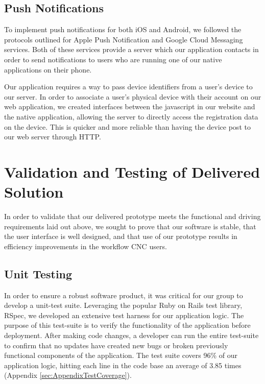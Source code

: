 \documentclass[12pt,letterpaper,titlepage]{article}
\begin{document}
\subsection{Push Notifications} \label{sec:PushNotifications}

To implement push notifications for both iOS and Android, we followed the protocols outlined for Apple Push Notification \cite{apn} and Google Cloud Messaging \cite{gcm} services. Both of these services provide a server which our application contacts in order to send notifications to users who are running one of our native applications on their phone.

Our application requires a way to pass device identifiers from a user's device to our server. In order to associate a user's physical device with their account on our web application, we created interfaces between the javascript in our website and the native application, allowing the server to directly access the registration data on the device. This is quicker and more reliable than having the device post to our web server through HTTP.

\section{Validation and Testing of Delivered Solution} \label{sec:ValidationandTestingofDeliveredSolution}

In order to validate that our delivered prototype meets the functional and driving requirements laid out above, we sought to prove that our software is stable, that the user interface is well designed, and that use of our prototype results in efficiency improvements in the workflow CNC users.

\subsection{Unit Testing} \label{sec:UnitTesting}

In order to ensure a robust software product, it was critical for our group to develop a unit-test suite. Leveraging the popular Ruby on Rails test library, RSpec, we developed an extensive test harness for our application logic. The purpose of this test-suite is to verify the functionality of the application before deployment. After making code changes, a developer can run the entire test-suite to confirm that no updates have created new bugs or broken previously functional components of the application. The test suite covers 96\% of our application logic, hitting each line in the code base an average of 3.85 times (Appendix \ref{sec:AppendixTestCoverage}).
\end{document}
